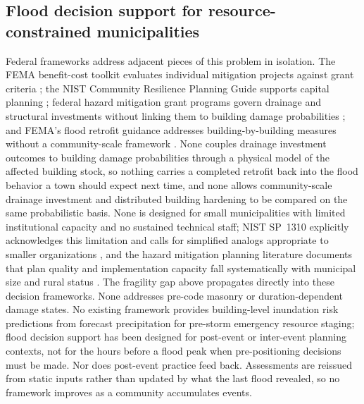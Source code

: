 \documentclass[11pt]{article}
\begin{document}
\subsection{Flood decision support for resource-constrained municipalities}
Federal frameworks address adjacent pieces of this problem in isolation. The FEMA
benefit-cost toolkit evaluates individual mitigation projects against grant
criteria \cite{fema2019bcatoolkit}; the NIST Community Resilience Planning Guide
supports capital planning \cite{mcallister2015nist1190v1,mcallister2015nist1190v2};
federal hazard mitigation grant programs govern drainage and structural
investments without linking them to building damage probabilities
\cite{fema2023hmaguide}; and FEMA's flood retrofit guidance addresses
building-by-building measures without a community-scale framework
\cite{fema2014p312,fema2012p259}.
None couples drainage investment outcomes to building damage probabilities through
a physical model of the affected building stock, so nothing carries a completed
retrofit back into the flood behavior a town should expect next time, and none allows
community-scale drainage investment and distributed building hardening to be compared
on the same probabilistic basis.
None is designed for small municipalities with limited institutional capacity and
no sustained technical staff; NIST SP~1310 explicitly acknowledges this limitation
and calls for simplified analogs appropriate to smaller organizations
\cite[Sec.~6.1.3]{davis2024nist}, and the hazard mitigation planning literature
documents that plan quality and implementation capacity fall systematically with
municipal size and rural status
\cite{smith2013statecapacity,horney2012ruralstatus,smith2026ruralcapacity}.
The fragility gap above propagates directly into these decision frameworks. None
addresses pre-code masonry or duration-dependent damage states.
No existing framework provides building-level inundation risk predictions from
forecast precipitation for pre-storm emergency resource staging; flood decision
support has been designed for post-event or inter-event planning contexts, not
for the hours before a flood peak when pre-positioning decisions must be made.
Nor does post-event practice feed back. Assessments are reissued from static inputs
rather than updated by what the last flood revealed, so no framework improves as a
community accumulates events.
\end{document}
